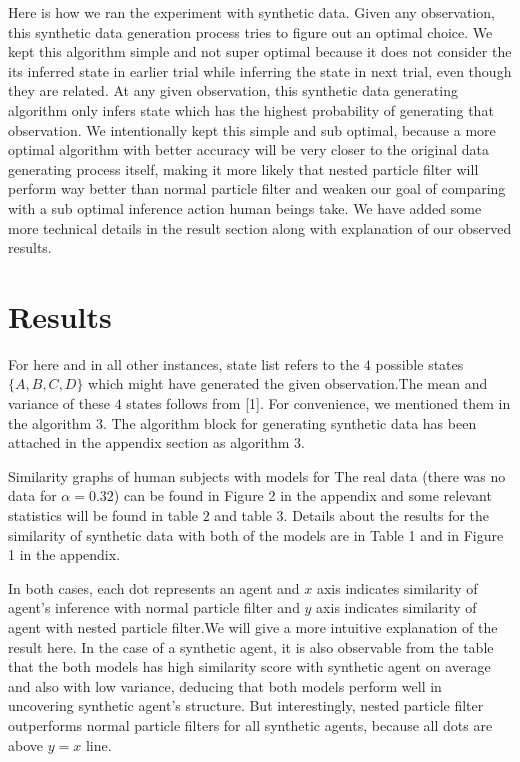\documentclass[12pt,letterpaper]{article}
\begin{document}
 Here is how we ran the experiment with synthetic data. Given any observation, this synthetic data generation process tries to figure out an optimal choice. We kept this algorithm simple and not super optimal because it does not consider the its inferred state in earlier trial while inferring the state in next trial, even though they are related. At any given observation, this synthetic data generating algorithm only infers state which has the highest probability of generating that observation. We intentionally kept this simple and sub optimal, because a more optimal algorithm with better accuracy will be very closer to the original data generating process itself, making it more likely that nested particle filter will perform way better than normal particle filter and weaken our goal of comparing with a sub optimal inference action human beings take. We have added some more technical details in the result section along with explanation of our observed results.

\section{Results}

For here and in all other instances, state list refers to the $4$ possible states $\{A,B,C,D\}$ which might have generated the given observation.The mean and variance of these $4$ states follows from [1]. For convenience, we mentioned them in the algorithm $3$. The algorithm block for generating synthetic data has been attached in the appendix section as algorithm 3.

Similarity graphs of human subjects with models for The real data (there was no data for $\alpha = 0.32$) can be found in Figure 2 in the appendix and some relevant statistics will be found in table $2$ and table $3$. Details about the results for the similarity of synthetic data with both of the models are in Table 1 and in Figure 1 in the appendix. 

In both cases, each dot represents an agent and $x$ axis indicates similarity of agent's inference with normal particle filter and $y$ axis indicates similarity of agent with nested particle filter.We will give a more intuitive explanation of the result here. In the case of a synthetic agent, it is also observable from the table that the both models has high similarity score with synthetic agent on average and also with low variance, deducing that both models perform well in uncovering synthetic agent's structure. But interestingly, nested particle filter outperforms normal particle filters for all synthetic agents, because all dots are above $y=x$ line.
\end{document}
